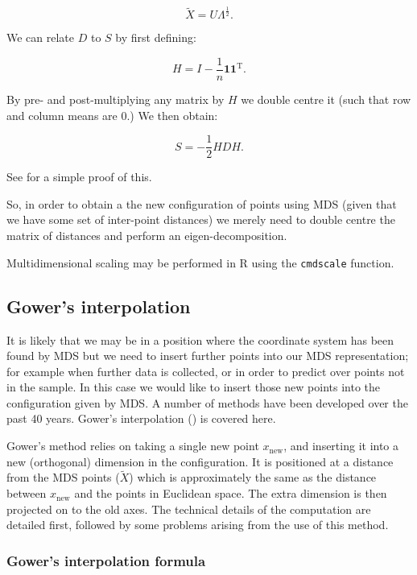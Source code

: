\documentclass[a4paper,10pt]{article}
\newcommand{\tr}[1]{#1^{\text{T}}}
\begin{document}
\begin{equation}
\tilde{X}=U\Lambda^{\frac{1}{2}}.
\end{equation}

We can relate $D$ to $S$ by first defining:

\begin{equation}
H = I-\frac{1}{n}\mathbf{1}\tr{\mathbf{1}}.
\end{equation}

By pre- and post-multiplying any matrix by $H$ we double centre it (such that row and column means are 0.) We then obtain:

\begin{equation}
S = -\frac{1}{2}HDH.
\end{equation}

See \cite{diaconis08} for a simple proof of this.

So, in order to obtain a the new configuration of points using MDS (given that we have some set of inter-point distances) we merely need to double centre the matrix of distances and perform an eigen-decomposition.

Multidimensional scaling may be performed in \textsf{R} using the \texttt{cmdscale} function. 

\subsection{Gower's interpolation} 

It is likely that we may be in a position where the coordinate system has been found by MDS but we need to insert further points into our MDS representation; for example when further data is collected, or in order to predict over points not in the sample. In this case we would like to insert those new points into the configuration given by MDS. A number of methods have been developed over the past 40 years. Gower's interpolation (\cite{gower1968}) is covered here.

Gower's method relies on taking a single new point $x_{\text{new}}$, and inserting it into a new (orthogonal) dimension in the configuration. It is positioned at a distance from the MDS points ($\tilde{X}$) which is approximately the same as the distance between $x_{\text{new}}$ and the points in Euclidean space. The extra dimension is then projected on to the old axes. The technical details of the computation are detailed first, followed by some problems arising from the use of this method. 

\subsubsection{Gower's interpolation formula}
\end{document}
